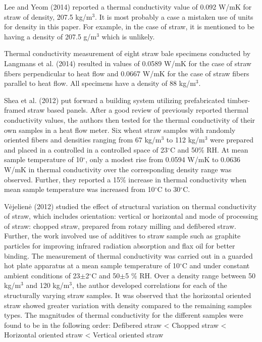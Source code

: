 \documentclass[12pt]{report}
\begin{document}
 Lee and Yeom (2014) reported a thermal conductivity value of 0.092 W/mK
for straw of density, 207.5 kg/m\(^{3}\). It is most probably a case a
mistaken use of units for density in this paper. For example, in the
case of straw, it is mentioned to be having a density of 207.5
g/m\(^{3}\) which is unlikely.

 Thermal conductivity measurement of eight straw bale specimens
conducted by Langmans et al. (2014) resulted in values of 0.0589 W/mK
for the case of straw fibers perpendicular to heat flow and 0.0667 W/mK
for the case of straw fibers parallel to heat flow. All specimens have a
density of 88 kg/m\(^{3}\).

Shea et al. (2012) put forward a building system utilizing prefabricated
timber-framed straw based panels. After a good review of previously
reported thermal conductivity values, the authors then tested for the
thermal conductivity of their own samples in a heat flow meter. Six
wheat straw samples with randomly oriented fibers and densities ranging
from 67 kg/m\(^{3}\) to 112 kg/m\(^{3}\) were prepared and placed in a
controlled in a controlled space of 23\(^{\circ}\)C and 50\% RH. At mean
sample temperature of 10\(^{\circ}\), only a modest rise from 0.0594
W/mK to 0.0636 W/mK in thermal conductivity over the corresponding
density range was observed. Further, they reported a 15\% increase in
thermal conductivity when mean sample temperature was increased from
10\(^{\circ}\)C to 30\(^{\circ}\)C.

 Vėjelienė (2012) studied the effect of structural variation on thermal
conductivity of straw, which includes orientation: vertical or
horizontal and mode of processing of straw: chopped straw, prepared from
rotary milling and defibered straw. Further, the work involved use of
additives to straw sample such as graphite particles for improving
infrared radiation absorption and flax oil for better binding. The
measurement of thermal conductivity was carried out in a guarded hot
plate apparatus at a mean sample temperature of 10\(^{\circ}\)C and
under constant ambient conditions of 23\(\pm\)2\(^{\circ}\)C and
50\(\pm\)5 \% RH. Over a density range between 50 kg/m\(^{3}\) and 120
kg/m\(^{3}\), the author developed correlations for each of the
structurally varying straw samples. It was observed that the horizontal
oriented straw showed greater variation with density compared to the
remaining samples types. The magnitudes of thermal conductivity for the
different samples were found to be in the following order: Defibered
straw \textless{} Chopped straw \textless{} Horizontal oriented straw
\textless{} Vertical oriented straw\\
\end{document}
